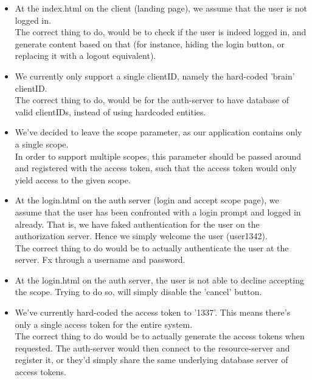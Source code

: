 \documentclass[12pt, a4paper]{article}
\begin{document}
  \begin{itemize}
    \item
      At the index.html on the client (landing page), we assume that the
      user is not logged in. \\
      The correct thing to do, would be to check if the user is indeed
      logged in, and generate content based on that (for instance,
      hiding the login button, or replacing it with a logout
      equivalent).

    \item
      We currently only support a single clientID, namely the hard-coded
      'brain' clientID. \\
      The correct thing to do, would be for the auth-server to have
      database of valid clientIDs, instead of using hardcoded entities.

    \item
      We've decided to leave the scope parameter, as our application
      contains only a single scope. \\
      In order to support multiple scopes, this parameter should be
      passed around and registered with the access token, such that the
      access token would only yield access to the given scope.

    \item
      At the login.html on the auth server (login and accept scope
      page), we assume that the user has been confronted with a login
      prompt and logged in already. That is, we have faked
      authentication for the user on the authorization server.
      Hence we simply welcome the user (user1342). \\
      The correct thing to do would be to actually authenticate the user
      at the server. Fx through a username and password.

    \item
      At the login.html on the auth server, the user is not able to
      decline accepting the scope.
      Trying to do so, will simply disable the 'cancel' button.

    \item
      We've currently hard-coded the access token to '1337'.
      This means there's only a single access token for the entire
      system. \\
      The correct thing to do would be to actually generate the access
      tokens when requested.
      The auth-server would then connect to the resource-server and
      register it, or they'd simply share the same underlying database
      server of access tokens.


\end{itemize}
\end{document}
